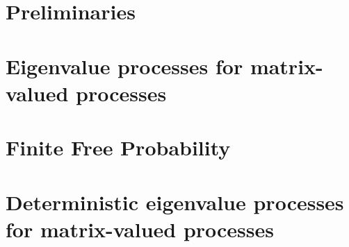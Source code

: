 \section{Preliminaries}



\section{Eigenvalue processes for matrix-valued processes}



\section{Finite Free Probability}



\section{Deterministic eigenvalue processes for matrix-valued processes}


